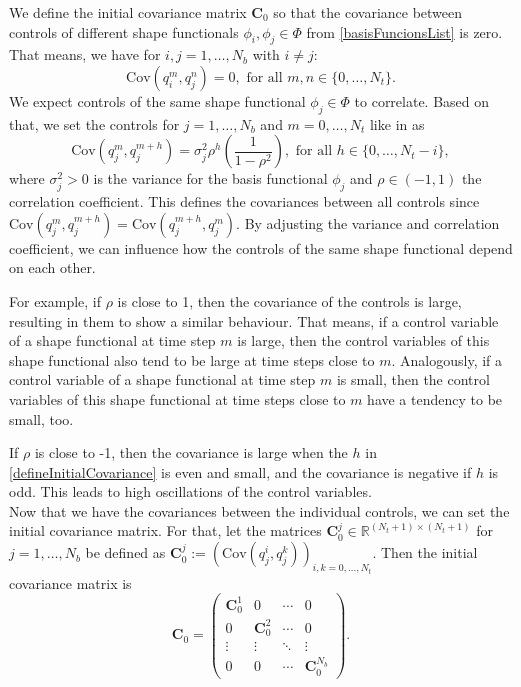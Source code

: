 We define the initial covariance matrix $\mathbf{C}_0$ so that the covariance between controls of different shape functionals $\phi_i,\phi_j\in\Phi$ from \eqref{basisFuncionsList} is zero. That means, we have for $i,j=1,\dotsc,N_b$ with $i\neq j$:
\begin{equation*}
\mathrm{Cov}(q_i^m,q_j^n)=0,\text{ for all }m,n\in\{0,\dotsc,N_t\}.
\end{equation*}
We expect controls of the same shape functional $\phi_j\in\Phi$ to correlate. Based on that, we set the controls for $j=1,\dotsc,N_b$ and $m=0,\dotsc,N_t$ like in \cite{Keil2022-dj} as
\begin{equation}
\label{defineInitialCovariance}
\mathrm{Cov}(q_j^m,q_j^{m+h})=\sigma_j^2\rho^h\left(\frac{1}{1-\rho^2}\right),\text{ for all }h\in\{0,\dotsc,N_t-i\},
\end{equation}
where $\sigma_j^2>0$ is the variance for the basis functional $\phi_j$ and $\rho\in(-1,1)$ the correlation coefficient. This defines the covariances between all controls since $\mathrm{Cov}(q_j^m,q_j^{m+h})=\mathrm{Cov}(q_j^{m+h},q_j^m)$. By adjusting the variance and correlation coefficient, we can influence how the controls of the same shape functional depend on each other.

For example, if $\rho$ is close to 1, then the covariance of the controls is large, resulting in them to show a similar behaviour. That means, if a control variable of a shape functional at time step $m$ is large, then the control variables of this shape functional also tend to be large at time steps close to $m$. Analogously, if a control variable of a shape functional at time step $m$ is small, then the control variables of this shape functional at time steps close to $m$ have a tendency to be small, too.

If $\rho$ is close to -1, then the covariance is large when the $h$ in \eqref{defineInitialCovariance} is even and small, and the covariance is negative if $h$ is odd. This leads to high oscillations of the control variables.\\

Now that we have the covariances between the individual controls, we can set the initial covariance matrix. For that, let the matrices $\mathbf{C}^j_0\in\mathbb{R}^{(N_t+1)\times(N_t+1)}$ for $j=1,\dotsc,N_b$ be defined as $\mathbf{C}^j_0:=\left(\mathrm{Cov}(q_j^i,q_j^{k})\right)_{i,k=0,\dotsc,N_t}$. Then the initial covariance matrix is
\begin{equation}
\label{initCov}
\mathbf{C}_0 =
\begin{pmatrix}
  \mathbf{C}^1_0 & 0 & \cdots & 0 \\
  0 & \mathbf{C}^2_0 & \cdots & 0 \\
  \vdots  & \vdots  & \ddots & \vdots  \\
  0 & 0 & \cdots & \mathbf{C}^{N_b}_0 
 \end{pmatrix}.
\end{equation}
\\

